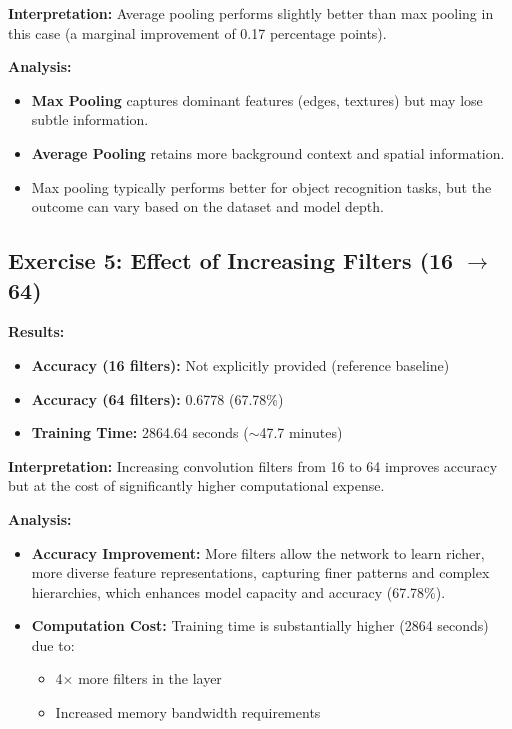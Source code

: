 \documentclass[11pt]{article}
\begin{document}
\textbf{Interpretation:} Average pooling performs slightly better than max pooling in this case (a marginal improvement of 0.17 percentage points).

\textbf{Analysis:}

\begin{itemize}
\item \textbf{Max Pooling} captures dominant features (edges, textures) but may lose subtle information.
\item \textbf{Average Pooling} retains more background context and spatial information.
\item Max pooling typically performs better for object recognition tasks, but the outcome can vary based on the dataset and model depth.
\end{itemize}

\subsection*{Exercise 5: Effect of Increasing Filters (16 $\rightarrow$ 64)}

\textbf{Results:}

\begin{itemize}
\item \textbf{Accuracy (16 filters):} Not explicitly provided (reference baseline)
\item \textbf{Accuracy (64 filters):} 0.6778 (67.78\%)
\item \textbf{Training Time:} 2864.64 seconds ($\sim$47.7 minutes)
\end{itemize}

\textbf{Interpretation:} Increasing convolution filters from 16 to 64 improves accuracy but at the cost of significantly higher computational expense.

\textbf{Analysis:}

\begin{itemize}
\item \textbf{Accuracy Improvement:} More filters allow the network to learn richer, more diverse feature representations, capturing finer patterns and complex hierarchies, which enhances model capacity and accuracy (67.78\%).
\item \textbf{Computation Cost:} Training time is substantially higher (2864 seconds) due to:
\begin{itemize}
\item 4$\times$ more filters in the layer
\item Increased memory bandwidth requirements
\end{itemize}
\end{itemize}
\end{document}
